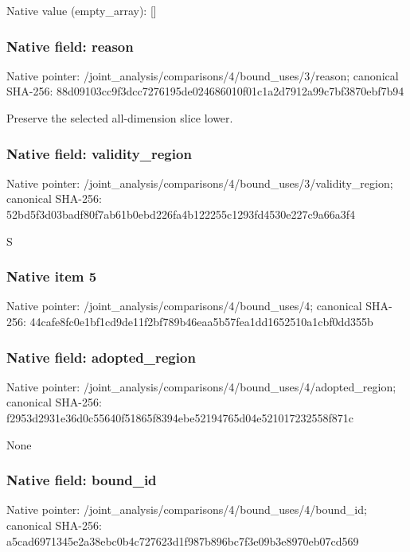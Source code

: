 \documentclass[10pt,a4paper]{article}
\begin{document}
Native value (empty\_\allowbreak{}array): []

\subsubsection{Native field: reason}
Native pointer: /joint\_\allowbreak{}analysis/comparisons/4/bound\_\allowbreak{}uses/3/reason; canonical SHA-256: 88d09103cc9f3dcc7276195de024686010f01c1a2d7912a99c7bf3870ebf7b94

\begingroup\raggedright\sloppy Preserve the selected all-dimension slice lower.\par\endgroup

\subsubsection{Native field: validity\_\allowbreak{}region}
Native pointer: /joint\_\allowbreak{}analysis/comparisons/4/bound\_\allowbreak{}uses/3/validity\_\allowbreak{}region; canonical SHA-256: 52bd5f3d03badf80f7ab61b0ebd226fa4b122255c1293fd4530e227c9a66a3f4

\begingroup\raggedright\sloppy S\par\endgroup

\subsubsection{Native item 5}
Native pointer: /joint\_\allowbreak{}analysis/comparisons/4/bound\_\allowbreak{}uses/4; canonical SHA-256: 44cafe8fc0e1bf1cd9de11f2bf789b46eaa5b57fea1dd1652510a1cbf0dd355b

\subsubsection{Native field: adopted\_\allowbreak{}region}
Native pointer: /joint\_\allowbreak{}analysis/comparisons/4/bound\_\allowbreak{}uses/4/adopted\_\allowbreak{}region; canonical SHA-256: f2953d2931e36d0c55640f51865f8394ebe52194765d04e521017232558f871c

\begingroup\raggedright\sloppy None\par\endgroup

\subsubsection{Native field: bound\_\allowbreak{}id}
Native pointer: /joint\_\allowbreak{}analysis/comparisons/4/bound\_\allowbreak{}uses/4/bound\_\allowbreak{}id; canonical SHA-256: a5cad6971345e2a38ebc0b4c727623d1f987b896bc7f3e09b3e8970eb07cd569
\end{document}
